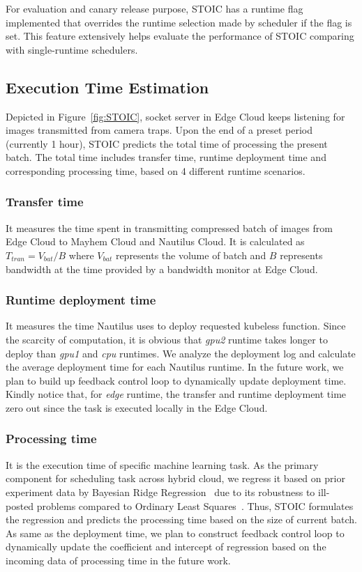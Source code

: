  For evaluation and canary release purpose, STOIC has a runtime flag implemented that overrides the runtime selection made by scheduler if the flag is set. This feature extensively helps evaluate the performance of STOIC comparing with single-runtime schedulers.
 
 
 \subsection{Execution Time Estimation}
 Depicted in Figure~\ref{fig:STOIC}, socket server in Edge Cloud keeps listening for images transmitted from camera traps. Upon the end of a preset period (currently 1 hour), STOIC predicts the total time of processing the present batch. The total time includes transfer time, runtime deployment time and corresponding processing time, based on 4 different runtime scenarios. 
 
 \subsubsection{Transfer time} It measures the time spent in transmitting compressed batch of images from Edge Cloud to Mayhem Cloud and Nautilus Cloud. It is calculated as ${T_{tran} = V_{bat} / B}$ where $V_{bat}$ represents the volume of batch and $B$ represents bandwidth at the time provided by a bandwidth monitor at Edge Cloud. 
 
 \subsubsection{Runtime deployment time} It measures the time Nautilus uses to deploy requested kubeless function. Since the scarcity of computation, it is obvious that \textit{gpu2} runtime takes longer to deploy than \textit{gpu1} and \textit{cpu} runtimes. We analyze the deployment log and calculate the average deployment time for each Nautilus runtime. In the future work, we plan to build up feedback control loop to dynamically update deployment time. Kindly notice that, for \textit{edge} runtime, the transfer and runtime deployment time zero out since the task is executed locally in the Edge Cloud.
 
 \subsubsection{Processing time} It is the execution time of specific machine learning task. As the primary component for scheduling task across hybrid cloud, we regress it based on prior experiment data by Bayesian Ridge Regression~\cite{ref:brr} due to its robustness to ill-posted problems compared to Ordinary Least Squares~\cite{ref:ols}. Thus, STOIC formulates the regression and predicts the processing time based on the size of current batch. As same as the deployment time, we plan to construct feedback control loop to dynamically update the coefficient and intercept of regression based on the incoming data of processing time in the future work.
 
